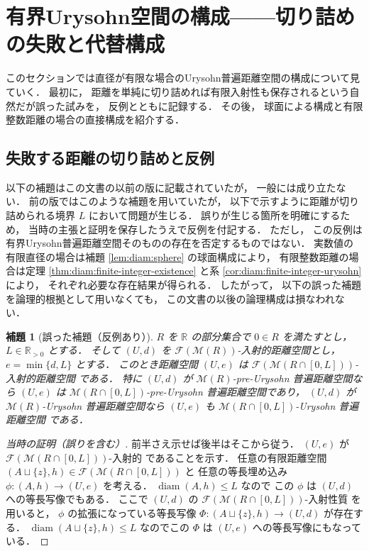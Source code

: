 \documentclass[leqno, 12pt]{jsarticle}
\newtheorem{lem}[thm]{補題}
\newcommand{\rr}{\mathbb{R}}
\DeclareMathOperator{\di}{diam}
\newcommand{\Met}[1]{\mathscr{M}(#1)}
\newcommand{\FinitePart}[1]{\mathscr{F}(#1)}
\newcommand{\FinMet}[1]{\FinitePart{\Met{#1}}}
\newcommand{\pospart}[1]{#1_{>0}}
\newcommand{\rrpos}{\pospart{\rr}}
\begin{document}

\newpage
\section{有界Urysohn空間の構成——切り詰めの失敗と代替構成}\label{sec:yuugen}
このセクションでは直径が有限な場合のUrysohn普遍距離空間の構成について見ていく．%
最初に，
距離を単純に切り詰めれば有限入射性も保存されるという自然だが誤った試みを，
反例とともに記録する．
その後，
球面による構成と有限整数距離の場合の直接構成を紹介する．



\subsection{失敗する距離の切り詰めと反例}\label{subsec:bounded:failed-truncation}

以下の補題はこの文書の以前の版に記載されていたが，
一般には成り立たない．
前の版ではこのような補題を用いていたが，
以下で示すように距離が切り詰められる境界
$L$
において問題が生じる．
誤りが生じる箇所を明確にするため，
当時の主張と証明を保存したうえで反例を付記する．
ただし，
この反例は有界Urysohn普遍距離空間そのものの存在を否定するものではない．
実数値の有限直径の場合は補題
\ref{lem:diam:sphere}
の球面構成により，
有限整数距離の場合は定理
\ref{thm:diam:finite-integer-existence}
と系
\ref{cor:diam:finite-integer-urysohn}
により，
それぞれ必要な存在結果が得られる．
したがって，
以下の誤った補題を論理的根拠として用いなくても，
この文書の以後の論理構成は損なわれない．

\begin{lem}[誤った補題（反例あり）]\label{lem:diam:restrict}
$R$
を
$\rr$
の部分集合で
$0\in R$
を満たすとし，
$L\in \rrpos$
とする．
そして
$(U, d)$
を
$\FinMet{R}$-入射的距離空間とし，
$e=\min\{d, L\}$%
とする．
このとき距離空間
$(U, e)$%
は
$\FinMet{R\cap [0, L]}$-入射的距離空間
である．
特に
$(U, d)$
が
$\Met{R}$-pre-Urysohn
普遍距離空間なら
$(U, e)$
は
$\Met{R\cap [0, L]}$-pre-Urysohn
普遍距離空間であり，
$(U, d)$
が
$\Met{R}$-Urysohn
普遍距離空間なら
$(U, e)$
も
$\Met{R\cap [0, L]}$-Urysohn
普遍距離空間
である．
\end{lem}
\begin{proof}[当時の証明（誤りを含む）]
前半さえ示せば後半はそこから従う．
$(U, e)$
が
$\FinMet{R\cap [0, L]}$-入射的
であることを示す．
任意の有限距離空間
$(A\sqcup\{z\}, h)\in \FinMet{R\cap [0, L]}$
と
任意の等長埋め込み
$\phi\colon  (A, h)\to (U,  e)$
を考える．
$\di(A, h)\le L$
なので
この
$\phi$
は
$(U, d)$
への等長写像でもある．
ここで
$(U, d)$
の
$\FinMet{R\cap [0, L]}$-入射性質
を用いると，
$\phi$%
の拡張になっている等長写像
$\Phi\colon  (A\sqcup\{z\}, h)\to (U, d)$
が存在する．
$\di(A\sqcup\{z\}, h)\le L$
なのでこの
$\Phi$
は
$(U, e)$
への等長写像にもなっている．
\end{proof}
\end{document}
